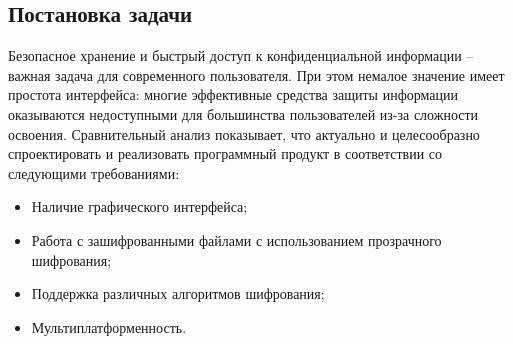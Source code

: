 \subsection{Постановка задачи}
Безопасное хранение и быстрый доступ к конфиденциальной информации -- важная
задача для современного пользователя. При этом немалое значение имеет простота интерфейса:
многие эффективные средства защиты информации оказываются недоступными для большинства пользователей из-за
сложности освоения. Сравнительный анализ показывает, что
актуально и целесообразно спроектировать и реализовать программный продукт
в соответствии со следующими требованиями:
\begin{itemize}
    \item Наличие графического интерфейса;
    \item Работа с зашифрованными файлами с использованием прозрачного шифрования;
    \item Поддержка различных алгоритмов шифрования;
    \item Мультиплатформенность.
\end{itemize}
